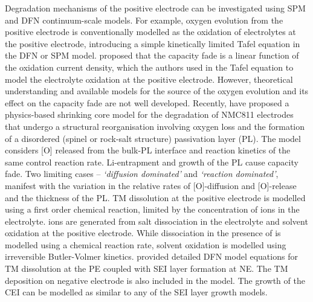\documentclass[aps,prb,twocolumn,superscriptaddress,reprint]{revtex4-1}
\begin{document}
Degradation mechanisms of the positive electrode can be investigated using SPM \cite{reniers2019review,jana2019physical} and DFN \cite{lin2013comprehensive} continuum-scale models. 
For example, oxygen evolution from the positive electrode is conventionally modelled as the oxidation of electrolytes at the positive electrode, introducing a simple kinetically limited Tafel equation \cite{lin2013comprehensive,reniers2019review} in the DFN or SPM model. 
\citeauthor{jana2019physical} proposed that the capacity fade is a linear function of the oxidation current density, which the authors used in the Tafel equation to model the electrolyte oxidation at the positive electrode.\cite{jana2019physical} 
However, theoretical understanding and available models for the source of the oxygen evolution and its effect on the capacity fade are not well developed. 
Recently, \citeauthor{ghosh2020shrinking} have proposed a physics-based shrinking core model for the degradation of NMC811 electrodes that undergo a structural reorganisation involving oxygen loss and the formation of a disordered (spinel or rock-salt structure) passivation layer (PL). \cite{ghosh2020shrinking} 
The model considers [O] released from the bulk-PL interface and reaction kinetics of the same control reaction rate. 
Li-entrapment and growth of the PL cause capacity fade. 
Two limiting cases – \textit{`diffusion dominated'} and \textit{`reaction dominated'}, manifest with the variation in the relative rates of [O]-diffusion and [O]-release and the thickness of the PL. 
TM dissolution at the positive electrode is modelled using a first order chemical reaction, limited by the concentration of  ions in the electrolyte. \cite{dai2012capacity} 
 ions are generated from  salt dissociation in the electrolyte and solvent oxidation at the positive electrode. 
While  dissociation in the presence of  is modelled using a chemical reaction rate, solvent oxidation is modelled using irreversible Butler-Volmer kinetics. \cite{dai2012capacity} 
\citeauthor{lin2013comprehensive} provided detailed DFN model equations for TM dissolution at the PE coupled with SEI layer formation at NE. \cite{lin2013comprehensive} 
The TM deposition on negative electrode is also included in the model. 
The growth of the CEI can be modelled as similar to any of the SEI layer growth models. 
\end{document}
